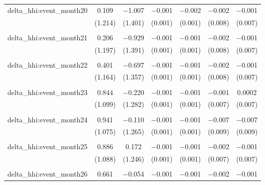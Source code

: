 \begin{table}[H]
{\begin{tabular}{@{\extracolsep{5pt}}lcccccc}
  delta\_hhi:event\_month20 & 0.109 & $-$1.007 & $-$0.001 & $-$0.002 & $-$0.002 & $-$0.001 \\  

   & (1.214) & (1.401) & (0.001) & (0.001) & (0.008) & (0.007) \\  

   & & & & & & \\  

  delta\_hhi:event\_month21 & 0.206 & $-$0.929 & $-$0.001 & $-$0.001 & $-$0.002 & $-$0.001 \\  

   & (1.197) & (1.391) & (0.001) & (0.001) & (0.008) & (0.007) \\  

   & & & & & & \\  

  delta\_hhi:event\_month22 & 0.401 & $-$0.697 & $-$0.001 & $-$0.001 & $-$0.002 & $-$0.001 \\  

   & (1.164) & (1.357) & (0.001) & (0.001) & (0.008) & (0.007) \\  

   & & & & & & \\  

  delta\_hhi:event\_month23 & 0.844 & $-$0.220 & $-$0.001 & $-$0.001 & $-$0.001 & 0.0002 \\  

   & (1.099) & (1.282) & (0.001) & (0.001) & (0.007) & (0.007) \\  

   & & & & & & \\  

  delta\_hhi:event\_month24 & 0.941 & $-$0.110 & $-$0.001 & $-$0.001 & $-$0.007 & $-$0.007 \\  

   & (1.075) & (1.265) & (0.001) & (0.001) & (0.009) & (0.009) \\  

   & & & & & & \\  

  delta\_hhi:event\_month25 & 0.886 & 0.172 & $-$0.001 & $-$0.001 & $-$0.002 & $-$0.001 \\  

   & (1.088) & (1.246) & (0.001) & (0.001) & (0.007) & (0.007) \\  

   & & & & & & \\  

  delta\_hhi:event\_month26 & 0.661 & $-$0.054 & $-$0.001 & $-$0.001 & $-$0.002 & $-$0.001 \\  


\end{tabular}}
\end{table}
